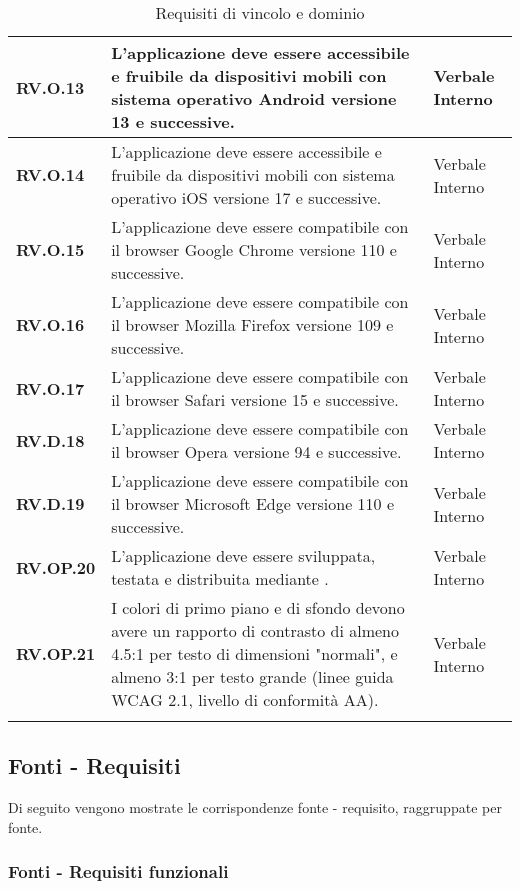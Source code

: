 \begin{longtable}{|P{3cm}|P{6,5cm}|>{\arraybackslash}P{4cm}|}
  \hline
  \textbf{RV.O.13} & L'applicazione deve essere accessibile e fruibile da dispositivi mobili con sistema operativo Android versione 13 e successive. & Verbale Interno \\
  \hline
  \textbf{RV.O.14} & L'applicazione deve essere accessibile e fruibile da dispositivi mobili con sistema operativo iOS versione 17 e successive. & Verbale Interno \\
  \hline
  \textbf{RV.O.15} & L'applicazione deve essere compatibile con il browser Google Chrome versione 110 e successive. & Verbale Interno \\
  \hline
  \textbf{RV.O.16} & L'applicazione deve essere compatibile con il browser Mozilla Firefox versione 109 e successive. & Verbale Interno \\
  \hline
  \textbf{RV.O.17} & L'applicazione deve essere compatibile con il browser Safari versione 15 e successive. & Verbale Interno \\
  \hline
  \textbf{RV.D.18} & L'applicazione deve essere compatibile con il browser Opera versione 94 e successive. & Verbale Interno \\
  \hline
  \textbf{RV.D.19} & L'applicazione deve essere compatibile con il browser Microsoft Edge versione 110 e successive. & Verbale Interno \\
  \hline
  \textbf{RV.OP.20} & L'applicazione deve essere sviluppata, testata e distribuita mediante . & Verbale Interno \\
  \hline
  \textbf{RV.OP.21} & I colori di primo piano e di sfondo devono avere un rapporto di contrasto di almeno 4.5:1 per testo di dimensioni "normali", e almeno 3:1 per testo grande (linee guida WCAG 2.1, livello di conformità AA). & Verbale Interno \\
  \hline
\caption{Requisiti di vincolo e dominio}
\label{requisitivincolo}
\end{longtable}

\subsection{Fonti - Requisiti}
Di seguito vengono mostrate le corrispondenze fonte - requisito, raggruppate per fonte.

\subsubsection{Fonti - Requisiti funzionali}

